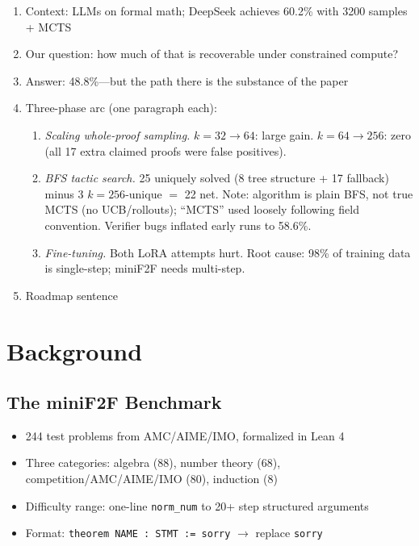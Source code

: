 \documentclass[openany, amssymb, psamsfonts]{amsart}
\begin{document}
\begin{enumerate}
  \item Context: LLMs on formal math; DeepSeek achieves 60.2\% with 3200 samples + MCTS
  \item Our question: how much of that is recoverable under constrained compute?
  \item Answer: 48.8\%---but the path there is the substance of the paper
  \item Three-phase arc (one paragraph each):
  \begin{enumerate}[{Phase} 1.]
    \item \textit{Scaling whole-proof sampling.} $k=32 \to 64$: large gain. $k=64 \to 256$: zero (all 17 extra claimed proofs were false positives).
    \item \textit{BFS tactic search.} 25 uniquely solved (8 tree structure + 17 fallback) minus 3 $k=256$-unique $=$ 22 net. Note: algorithm is plain BFS, not true MCTS (no UCB/rollouts); ``MCTS'' used loosely following field convention. Verifier bugs inflated early runs to 58.6\%.
    \item \textit{Fine-tuning.} Both LoRA attempts hurt. Root cause: 98\% of training data is single-step; miniF2F needs multi-step.
  \end{enumerate}
  \item Roadmap sentence
\end{enumerate}

\section{Background}

\subsection{The miniF2F Benchmark}
\begin{itemize}
  \item 244 test problems from AMC/AIME/IMO, formalized in Lean 4
  \item Three categories: algebra (88), number theory (68), competition/AMC/AIME/IMO (80), induction (8)
  \item Difficulty range: one-line \texttt{norm\_num} to 20+ step structured arguments
  \item Format: \texttt{theorem NAME : STMT := sorry} $\to$ replace \texttt{sorry}
\end{itemize}
\end{document}
